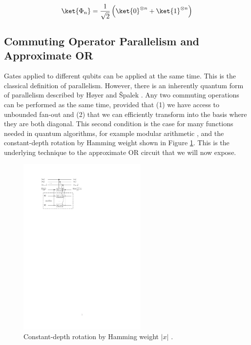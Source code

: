 \begin{equation}
\label{eqn:cat}
\ket{\Phi_n} = \frac{1}{\sqrt{2}}
\left(\ket{0}^{\otimes n} + \ket{1}^{\otimes n}\right)
\end{equation}

\subsection{Commuting Operator Parallelism and Approximate \textsc{OR}}

Gates applied to different qubits can be applied at the same time. This is
the classical definition of parallelism. However, there is an inherently
quantum form of parallelism described by H{\o}yer and {\v S}palek
\cite{Hoyer2002}. Any two commuting operations
can be performed as the same time, provided that (1) we have access to
unbounded fan-out and (2) that we can efficiently transform
into the basis where they are both diagonal.
This second condition is the case for many
functions needed in quantum algorithms, for example modular arithmetic
\cite{Moore1998}, and the constant-depth rotation by Hamming weight shown
in Figure \ref{fig:rotate-hamming}. This is the underlying technique to
the approximate \textsc{OR} circuit that we will now expose.

\begin{figure}
\begin{center}
\includegraphics[width=2.5in]{figures/rotate-hamming.pdf}
\caption{Constant-depth rotation by Hamming weight $|x|$ \cite{Hoyer2002}.}
\label{fig:rotate-hamming}
\end{center}
\end{figure}

